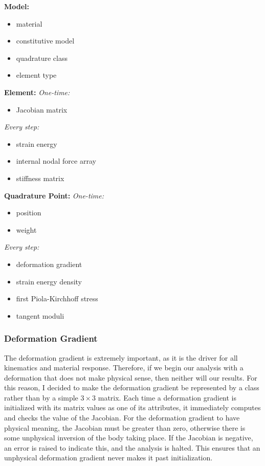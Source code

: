 \documentclass[]{spie}  %
\begin{document}
\noindent
\textbf{Model:}
\begin{itemize}
	\item material
	\item constitutive model
	\item quadrature class
	\item element type
\end{itemize}

\noindent
\textbf{Element:} \smallbreak
\indent \textit{One-time:}
\begin{itemize}
	\item Jacobian matrix
\end{itemize}
\smallbreak \textit{Every step:}
\begin{itemize}
	\item strain energy
	\item internal nodal force array
	\item stiffness matrix
\end{itemize}

\noindent
\textbf{Quadrature Point:} \smallbreak
\textit{One-time:}
\begin{itemize}
	\item position
	\item weight
\end{itemize}
\smallbreak \textit{Every step:}
\begin{itemize}
	\item deformation gradient
	\item strain energy density
	\item first Piola-Kirchhoff stress
	\item tangent moduli
\end{itemize}


\subsubsection{Deformation Gradient}
The deformation gradient is extremely important, as it is the driver for all kinematics and material response. Therefore, if we begin our analysis with a deformation that does not make physical sense, then neither will our results. For this reason, I decided to make the deformation gradient be represented by a class rather than by a simple $3 \times 3$ matrix. Each time a deformation gradient is initialized with its matrix values as one of its attributes, it immediately computes and checks the value of the Jacobian. For the deformation gradient to have physical meaning, the Jacobian must be greater than zero, otherwise there is some unphysical inversion of the body taking place. If the Jacobian is negative, an error is raised to indicate this, and the analysis is halted. This ensures that an unphysical deformation gradient never makes it past initialization. 
\end{document}
